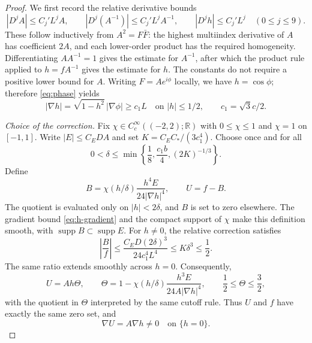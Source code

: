 \documentclass[11pt,a4paper,leqno]{amsart}
\numberwithin{equation}{section}
\theoremstyle{landisplain}
\theoremstyle{landisdefinition}
\theoremstyle{landisremark}
\newcommand{\R}{\mathbb R}
\newcommand{\supp}{\operatorname{supp}}
\begin{document}
\begin{proof}
We first record the relative derivative bounds
\begin{equation}\label{eq:Ah-bounds}
 |D^jA|\le C_j'L^jA,\qquad
 |D^j(A^{-1})|\le C_j'L^jA^{-1},\qquad
 |D^jh|\le C_j'L^j\quad(0\le j\le9).
\end{equation}
These follow inductively from $A^2=F\bar F$: the highest
multiindex derivative of $A$ has coefficient $2A$, and each
lower-order product has the required homogeneity. Differentiating
$AA^{-1}=1$ gives the estimate for $A^{-1}$, after which the
product rule applied to $h=fA^{-1}$ gives the estimate for $h$.
The constants do not require a positive lower bound for $A$.
Writing $F=Ae^{i\phi}$ locally, we have $h=\cos\phi$;
therefore \eqref{eq:phase} yields
\begin{equation}\label{eq:h-gradient}
 |\nabla h|=\sqrt{1-h^2}\,|\nabla\phi|
 \ge c_1L\quad\text{on }|h|\le1/2,
 \qquad c_1=\sqrt3c/2.
\end{equation}

\smallskip\noindent\emph{Choice of the correction.}
Fix $\chi\in C_c^\infty((-2,2);\R)$ with $0\le\chi\le1$ and
$\chi=1$ on $[-1,1]$. Write $|E|\le C_EDA$ and set
$K=C_EC_*/(3c_1^4)$. Choose once and for all
\begin{equation}\label{eq:delta-choice}
 0<\delta\le\min\left\{\frac18,\frac{c_1b}{4},(2K)^{-1/3}\right\}.
\end{equation}
Define
\begin{equation}\label{eq:correction}
 B=\chi(h/\delta)\frac{h^4E}{24|\nabla h|^4},\qquad U=f-B.
\end{equation}
The quotient is evaluated only on $|h|<2\delta$, and $B$ is
set to zero elsewhere. The gradient bound
\eqref{eq:h-gradient} and the compact support of $\chi$ make
this definition smooth, with $\supp B\subset\supp E$.
For $h\ne0$, the relative correction satisfies
\[
 \left|\frac Bf\right|
 \le\frac{C_ED(2\delta)^3}{24c_1^4L^4}
 \le K\delta^3\le\frac12.
\]
The same ratio extends smoothly across $h=0$. Consequently,
\begin{equation}\label{eq:comparison}
 U=Ah\Theta,\qquad
 \Theta=1-\chi(h/\delta)\frac{h^3E}{24A|\nabla h|^4},
 \qquad \frac12\le\Theta\le\frac32,
\end{equation}
with the quotient in $\Theta$ interpreted by the same cutoff rule.
Thus $U$ and $f$ have exactly the same zero set, and
\begin{equation}\label{eq:transverse-U}
 \nabla U=A\nabla h\ne0\quad\text{on }\{h=0\}.
\end{equation}


\end{proof}
\end{document}
